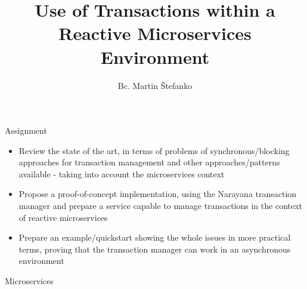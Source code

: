\documentclass{beamer}
\title{Use of Transactions within a Reactive Microservices Environment} %
\author{Bc. Martin Štefanko}
\begin{document}
  \frame{\maketitle}
    
    \begin{frame}{Assignment}
        \begin{itemize}
            \item Review the state of the art, in terms of problems of synchronous/blocking approaches for transaction management and other approaches/patterns available - taking into account the microservices context
            
            \item Propose a proof-of-concept implementation, using the Narayana transaction manager and prepare a service capable to manage transactions in the context of reactive microservices
            
            \item Prepare an example/quickstart showing the whole issues in more practical terms, proving that the transaction manager can work in an asynchronous environment
        \end{itemize}
    
    \end{frame}   
     
    \begin{frame}{Microservices}
    
    
    \end{frame}
\end{document}
